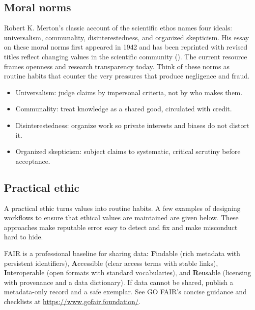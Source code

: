 \documentclass[
  a4paper,
  DIV=11,
  numbers=noendperiod,
  oneside]{scrreprt}
\providecommand{\tightlist}{%
  \setlength{\itemsep}{0pt}\setlength{\parskip}{0pt}}
\begin{document}
\subsection{Moral norms}\label{moral-norms}

Robert K. Merton's classic account of the scientific ethos names four
ideals: universalism, communality, disinterestedness, and organized
skepticism. His essay on these moral norms first appeared in 1942 and
has been reprinted with revised titles reflect changing values in the
scientific community (). The
current resource frames openness and research transparency today. Think
of these norms as routine habits that counter the very pressures that
produce negligence and fraud.

\begin{itemize}
\tightlist
\item
  Universalism: judge claims by impersonal criteria, not by who makes
  them.
\item
  Communality: treat knowledge as a shared good, circulated with credit.
\item
  Disinterestedness: organize work so private interests and biases do
  not distort it.
\item
  Organized skepticism: subject claims to systematic, critical scrutiny
  before acceptance.
\end{itemize}

\subsection{Practical ethic}\label{practical-ethic}

A practical ethic turns values into routine habits. A few examples of
designing workflows to ensure that ethical values are maintained are
given below. These approaches make reputable error easy to detect and
fix and make misconduct hard to hide.

\begin{tcolorbox}[enhanced jigsaw, colframe=quarto-callout-note-color-frame, title=\textcolor{quarto-callout-note-color}{\faInfo}\hspace{0.5em}{FAIR data}, breakable, opacityback=0, titlerule=0mm, colbacktitle=quarto-callout-note-color!10!white, toptitle=1mm, colback=white, coltitle=black, toprule=.15mm, bottomtitle=1mm, left=2mm, arc=.35mm, rightrule=.15mm, bottomrule=.15mm, opacitybacktitle=0.6, leftrule=.75mm]

FAIR is a professional baseline for sharing data: \textbf{F}indable
(rich metadata with persistent identifiers), \textbf{A}ccessible (clear
access terms with stable links), \textbf{I}nteroperable (open formats
with standard vocabularies), and \textbf{R}eusable (licensing with
provenance and a data dictionary). If data cannot be shared, publish a
metadata-only record and a safe exemplar. See GO FAIR's concise guidance
and checklists at \url{https://www.gofair.foundation/}.

\end{tcolorbox}
\end{document}
